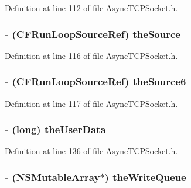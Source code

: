 Definition at line 112 of file AsyncTCPSocket.h.

\hypertarget{interface_async_t_c_p_socket_a802a0e3f2294d4bb644f44e1cd8dfbbd}{
\subsubsection[{theSource}]{\setlength{\rightskip}{0pt plus 5cm}-\/ (CFRunLoopSourceRef) {\bf theSource}}}
\label{interface_async_t_c_p_socket_a802a0e3f2294d4bb644f44e1cd8dfbbd}


Definition at line 116 of file AsyncTCPSocket.h.

\hypertarget{interface_async_t_c_p_socket_afa4beb0b77a9fc1de8e37e665ef8ab99}{
\subsubsection[{theSource6}]{\setlength{\rightskip}{0pt plus 5cm}-\/ (CFRunLoopSourceRef) {\bf theSource6}}}
\label{interface_async_t_c_p_socket_afa4beb0b77a9fc1de8e37e665ef8ab99}


Definition at line 117 of file AsyncTCPSocket.h.

\hypertarget{interface_async_t_c_p_socket_af6dc350be3ed36a9ea2bd10580c263d2}{
\subsubsection[{theUserData}]{\setlength{\rightskip}{0pt plus 5cm}-\/ (long) {\bf theUserData}}}
\label{interface_async_t_c_p_socket_af6dc350be3ed36a9ea2bd10580c263d2}


Definition at line 136 of file AsyncTCPSocket.h.

\hypertarget{interface_async_t_c_p_socket_a857acc35e8665476b20d0355761e8b08}{
\subsubsection[{theWriteQueue}]{\setlength{\rightskip}{0pt plus 5cm}-\/ (NSMutableArray$\ast$) {\bf theWriteQueue}}}
\label{interface_async_t_c_p_socket_a857acc35e8665476b20d0355761e8b08}


